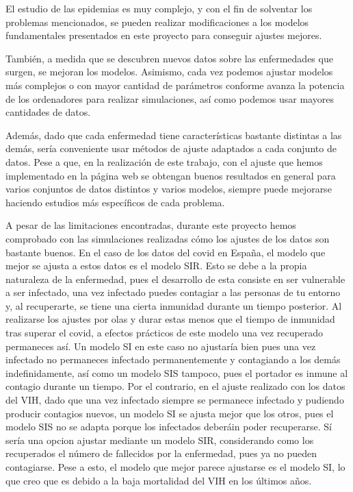 El estudio de las epidemias es muy complejo, y con el fin de solventar los problemas mencionados, se pueden realizar modificaciones a los modelos fundamentales presentados en este proyecto para conseguir ajustes mejores.

También, a medida que se descubren nuevos datos sobre las enfermedades que surgen, se mejoran los modelos. Asimismo, cada vez podemos ajustar modelos más complejos o con mayor cantidad de parámetros conforme avanza la potencia de los ordenadores para realizar simulaciones, así como podemos usar mayores cantidades de datos.

Además, dado que cada enfermedad tiene características bastante distintas a las demás, sería conveniente usar métodos de ajuste adaptados a cada conjunto de datos. Pese a que, en la realización de este trabajo, con el ajuste que hemos implementado en la página web se obtengan buenos resultados en general para varios conjuntos de datos distintos y varios modelos, siempre puede mejorarse haciendo estudios más específicos de cada problema.

A pesar de las limitaciones encontradas, durante este proyecto hemos comprobado con las simulaciones realizadas cómo los ajustes de los datos son bastante buenos. En el caso de los datos del covid en España, el modelo que mejor se ajusta a estos datos es el modelo SIR. Esto se debe a la propia naturaleza de la enfermedad, pues el desarrollo de esta consiste en ser vulnerable a ser infectado, una vez infectado puedes contagiar a las personas de tu entorno y, al recuperarte, se tiene una cierta inmunidad durante un tiempo posterior. Al realizarse los ajustes por olas y durar estas menos que el tiempo de inmunidad tras superar el covid, a efectos prácticos de este modelo una vez recuperado permaneces así. Un modelo SI en este caso no ajustaría bien pues una vez infectado no permaneces infectado permanentemente y contagiando a los demás indefinidamente, así como un modelo SIS tampoco, pues el portador es inmune al contagio durante un tiempo. Por el contrario, en el ajuste realizado con los datos del VIH, dado que una vez infectado siempre se permanece infectado y pudiendo producir contagios nuevos, un modelo SI se ajusta mejor que los otros, pues el modelo SIS no se adapta porque los infectados deberáin poder recuperarse. Sí sería una opcion ajustar mediante un modelo SIR, considerando como los recuperados el número de fallecidos por la enfermedad, pues ya no pueden contagiarse. Pese a esto, el modelo que mejor parece ajustarse es el modelo SI, lo que creo que es debido a la baja mortalidad del VIH en los últimos años.

